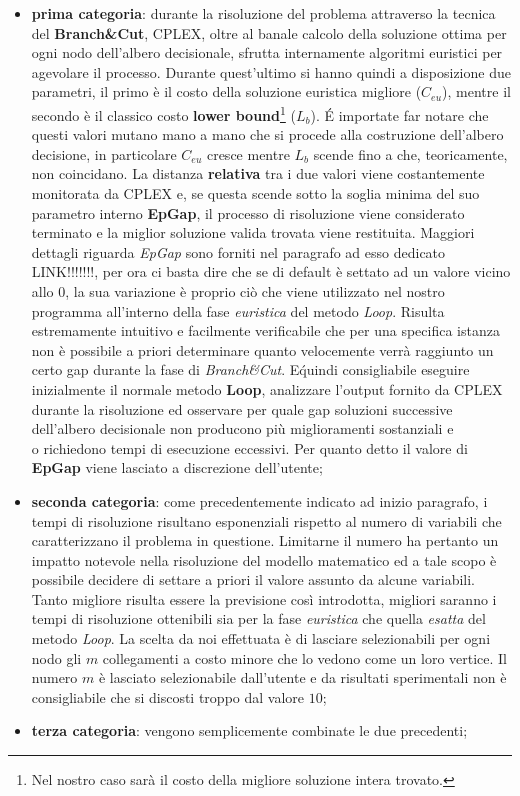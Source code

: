 \documentclass[11pt]{article}
\begin{document}
\begin{itemize}
    \item \textbf{prima categoria}: durante la risoluzione del problema attraverso la tecnica del \textbf{Branch\&Cut}, CPLEX, oltre al banale calcolo della soluzione ottima per ogni nodo dell'albero decisionale, sfrutta internamente algoritmi euristici per agevolare il processo. Durante quest'ultimo si hanno quindi a disposizione due parametri, il primo è il costo della soluzione euristica migliore (\textbf{$C_{eu}$}), mentre il secondo è il classico costo \textbf{lower bound}\footnote{Nel nostro caso sarà il costo della migliore soluzione intera trovato.} (\textbf{$L_{b}$}). \'E importate far notare che questi valori mutano mano a mano che si procede alla costruzione dell'albero decisione, in particolare \textbf{$C_{eu}$} cresce mentre \textbf{$L_{b}$} scende fino a che, teoricamente, non coincidano.
    La distanza \textbf{relativa} tra i due valori viene costantemente monitorata da CPLEX e, se questa scende sotto la soglia minima del suo parametro interno \textbf{EpGap}, il processo di risoluzione viene considerato terminato e la miglior soluzione valida trovata viene restituita. Maggiori dettagli riguarda \textit{EpGap} sono forniti nel paragrafo ad esso dedicato LINK!!!!!!!, per ora ci basta dire che se di default è settato ad un valore vicino allo $0$, la sua variazione è proprio ciò che viene utilizzato nel nostro programma all'interno della fase \textit{euristica} del metodo \textit{Loop}.
    Risulta estremamente intuitivo e facilmente verificabile che per una specifica istanza non è possibile a priori determinare quanto velocemente verrà raggiunto un certo gap durante la fase di \textit{Branch\&Cut}. E\' quindi consigliabile eseguire inizialmente il normale metodo \textbf{Loop}, analizzare l'output fornito da CPLEX durante la risoluzione ed osservare per quale gap soluzioni successive dell'albero decisionale non producono più miglioramenti sostanziali e\\o richiedono tempi di esecuzione eccessivi. Per quanto detto il valore di \textbf{EpGap} viene lasciato a discrezione dell'utente;
    \item \textbf{seconda categoria}: come precedentemente indicato ad inizio paragrafo, i tempi di risoluzione risultano esponenziali rispetto al numero di variabili che caratterizzano il problema in questione. Limitarne il numero ha pertanto un impatto notevole nella risoluzione del modello matematico ed a tale scopo è possibile decidere di settare a priori il valore assunto da alcune variabili. Tanto migliore risulta essere la previsione così introdotta, migliori saranno i tempi di risoluzione ottenibili sia per la fase \textit{euristica} che quella \textit{esatta} del metodo \textit{Loop}. La scelta da noi effettuata è di lasciare selezionabili per ogni nodo gli $m$ collegamenti a costo minore che lo vedono come un loro vertice. Il numero $m$ è lasciato selezionabile dall'utente e da risultati sperimentali non è consigliabile che si discosti troppo dal valore $10$;
    \item \textbf{terza categoria}: vengono semplicemente combinate le due precedenti;
\end{itemize}
\end{document}
